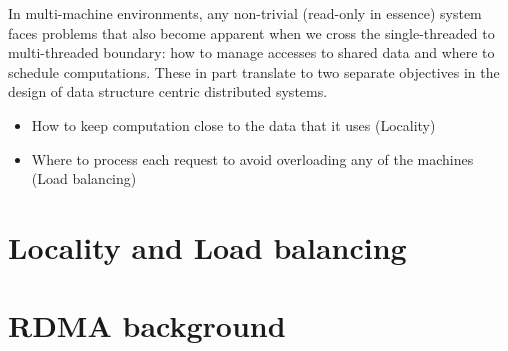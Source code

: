 In multi-machine environments, any non-trivial (read-only in essence) system
faces problems that also become apparent when we cross the single-threaded
to multi-threaded boundary: how to manage accesses to shared data and where to
schedule computations. These in part translate to two separate objectives in
the design of data structure centric distributed systems. 
\begin{itemize}
    \item How to keep computation close to the data that it uses (Locality)
    \item Where to process each request to avoid overloading any of the machines (Load balancing)
\end{itemize}


\section{Locality and Load balancing}


\section{RDMA background}

